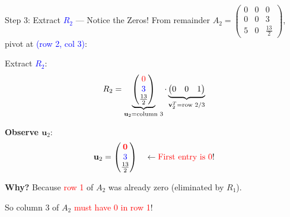 \documentclass[10pt]{beamer}
\theoremstyle{definition}
\newcommand{\x}[1]{\alert{\textbf{#1}}}
\begin{document}
\begin{frame}[fragile]{Step 3: Extract \textcolor{blue}{$R_2$} — Notice the Zeros!}
From remainder $A_2 = \begin{pmatrix} 0 & 0 & 0 \\ 0 & 0 & 3 \\ 5 & 0 & \frac{13}{2} \end{pmatrix}$, pivot at \textcolor{blue}{(row 2, col 3)}:

\vfill
Extract \textcolor{blue}{$R_2$}:
$$R_2 = \underbrace{\begin{pmatrix} \textcolor{red}{0} \\ \textcolor{blue}{3} \\ \frac{13}{2} \end{pmatrix}}_{\mathbf{u}_2 = \text{column 3}} \cdot \underbrace{\begin{pmatrix} 0 & 0 & 1 \end{pmatrix}}_{\mathbf{v}_2^T = \text{row 2}/3}$$

\vfill
\x{Observe $\mathbf{u}_2$}:
$$\mathbf{u}_2 = \begin{pmatrix} \textcolor{red}{\mathbf{0}} \\ \textcolor{blue}{3} \\ \frac{13}{2} \end{pmatrix} \quad \leftarrow \text{\textcolor{red}{First entry is 0}!}$$

\vfill
\x{Why?} Because \textcolor{red}{row 1} of $A_2$ was already zero (eliminated by $R_1$).

So column 3 of $A_2$ \textcolor{red}{must have 0 in row 1}!
\end{frame}
\end{document}

